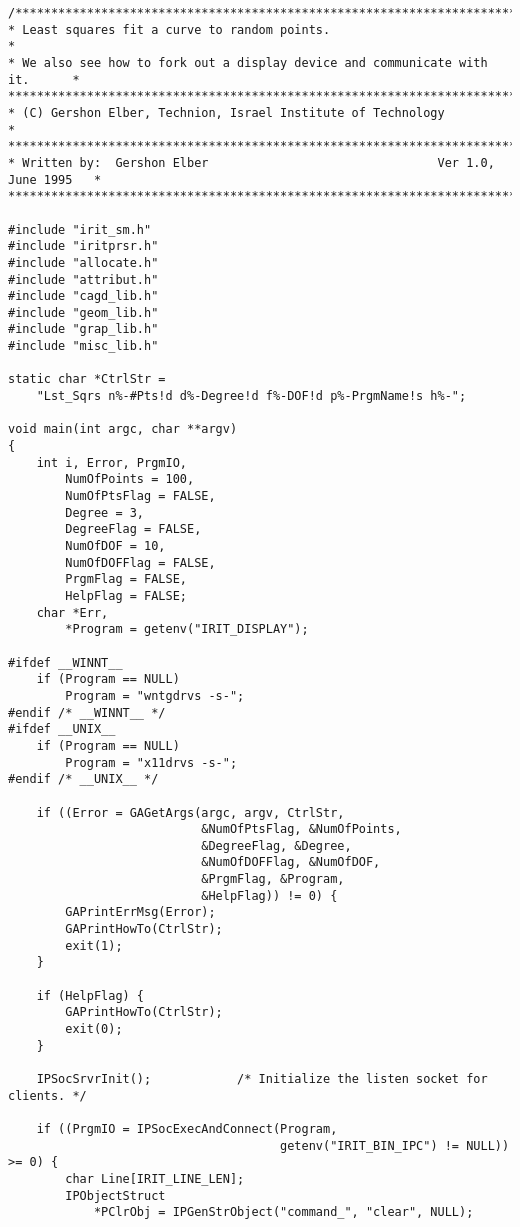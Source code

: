\begin{verbatim}
/*****************************************************************************
* Least squares fit a curve to random points.                                     *
* We also see how to fork out a display device and communicate with it.      *
******************************************************************************
* (C) Gershon Elber, Technion, Israel Institute of Technology                *
******************************************************************************
* Written by:  Gershon Elber                                Ver 1.0, June 1995   *
*****************************************************************************/

#include "irit_sm.h"
#include "iritprsr.h"
#include "allocate.h"
#include "attribut.h"
#include "cagd_lib.h"
#include "geom_lib.h"
#include "grap_lib.h"
#include "misc_lib.h"

static char *CtrlStr =
    "Lst_Sqrs n%-#Pts!d d%-Degree!d f%-DOF!d p%-PrgmName!s h%-";

void main(int argc, char **argv)
{
    int i, Error, PrgmIO,
        NumOfPoints = 100,
        NumOfPtsFlag = FALSE,
        Degree = 3,
        DegreeFlag = FALSE,
        NumOfDOF = 10,
        NumOfDOFFlag = FALSE,
        PrgmFlag = FALSE,
        HelpFlag = FALSE;
    char *Err,
        *Program = getenv("IRIT_DISPLAY");

#ifdef __WINNT__
    if (Program == NULL)
        Program = "wntgdrvs -s-";
#endif /* __WINNT__ */
#ifdef __UNIX__
    if (Program == NULL)
        Program = "x11drvs -s-";
#endif /* __UNIX__ */

    if ((Error = GAGetArgs(argc, argv, CtrlStr,
                           &NumOfPtsFlag, &NumOfPoints,
                           &DegreeFlag, &Degree,
                           &NumOfDOFFlag, &NumOfDOF,
                           &PrgmFlag, &Program,
                           &HelpFlag)) != 0) {
        GAPrintErrMsg(Error);
        GAPrintHowTo(CtrlStr);
        exit(1);
    }

    if (HelpFlag) {
        GAPrintHowTo(CtrlStr);
        exit(0);
    }

    IPSocSrvrInit();            /* Initialize the listen socket for clients. */

    if ((PrgmIO = IPSocExecAndConnect(Program,
                                      getenv("IRIT_BIN_IPC") != NULL)) >= 0) {
        char Line[IRIT_LINE_LEN];
        IPObjectStruct
            *PClrObj = IPGenStrObject("command_", "clear", NULL);


\end{verbatim}
